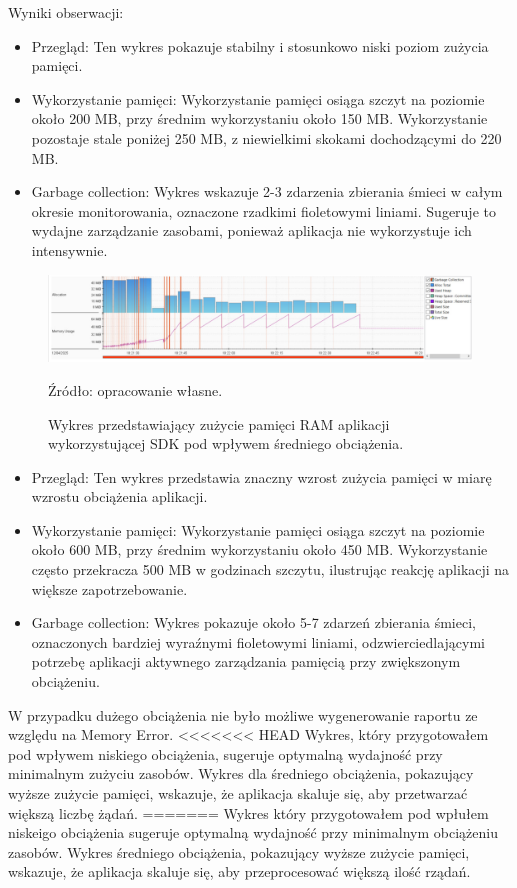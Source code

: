 \documentclass[runningheads,12pt]{llncs}
\begin{document}
Wyniki obserwacji:

\begin{itemize}
    \item Przegląd: Ten wykres pokazuje stabilny i stosunkowo niski poziom zużycia pamięci.
    \item Wykorzystanie pamięci: Wykorzystanie pamięci osiąga szczyt na poziomie około 200 MB, przy średnim wykorzystaniu około 150 MB. Wykorzystanie pozostaje stale poniżej 250 MB, z niewielkimi skokami dochodzącymi do 220 MB.
    \item Garbage collection: Wykres wskazuje 2-3 zdarzenia zbierania śmieci w całym okresie monitorowania, oznaczone rzadkimi fioletowymi liniami. Sugeruje to wydajne zarządzanie zasobami, ponieważ aplikacja nie wykorzystuje ich intensywnie.
\end{itemize}

\newpage

\begin{figure}
    \includegraphics[width=\linewidth]{images/sdk-memory-middle-graph.jpg}
    \caption{Wykres przedstawiający zużycie pamięci  RAM aplikacji wykorzystującej SDK pod wpływem średniego obciążenia.} \label{fig1}
    \vspace{0.5em}
    {\small Źródło: opracowanie własne.}
\end{figure}

\begin{itemize}
    \item Przegląd: Ten wykres przedstawia znaczny wzrost zużycia pamięci w miarę wzrostu obciążenia aplikacji.
    \item Wykorzystanie pamięci: Wykorzystanie pamięci osiąga szczyt na poziomie około 600 MB, przy średnim wykorzystaniu około 450 MB. Wykorzystanie często przekracza 500 MB w godzinach szczytu, ilustrując reakcję aplikacji na większe zapotrzebowanie.
    \item Garbage collection: Wykres pokazuje około 5-7 zdarzeń zbierania śmieci, oznaczonych bardziej wyraźnymi fioletowymi liniami, odzwierciedlającymi potrzebę aplikacji aktywnego zarządzania pamięcią przy zwiększonym obciążeniu.
\end{itemize}

W przypadku dużego obciążenia nie było możliwe wygenerowanie raportu ze względu na Memory Error.
<<<<<<< HEAD
Wykres, który przygotowałem pod wpływem niskiego obciążenia, sugeruje optymalną wydajność przy minimalnym zużyciu zasobów. Wykres dla średniego obciążenia, pokazujący wyższe zużycie pamięci, wskazuje, że aplikacja skaluje się, aby przetwarzać większą liczbę żądań.
=======
Wykres który przygotowałem pod wpłułem niskeigo obciążenia sugeruje optymalną wydajność przy minimalnym obciążeniu zasobów. Wykres średniego obciążenia, pokazujący wyższe zużycie pamięci, wskazuje, że aplikacja skaluje się, aby przeprocesować większą ilość rządań.
\end{document}
